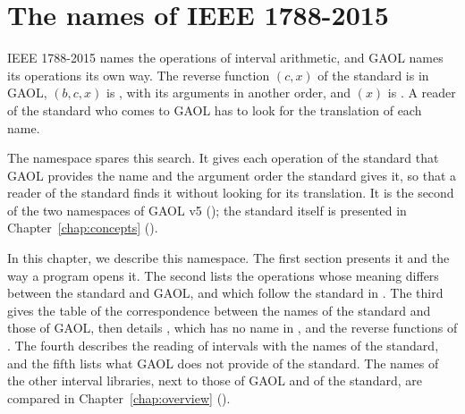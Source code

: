 \chapter{The names of IEEE 1788-2015}\label{chap:ieee1788}
%

IEEE 1788-2015 \cite{IEEE1788:2015} names the operations of interval
arithmetic, and GAOL names its operations its own way. The reverse function
$(c,x)$ of the standard is  in GAOL,
$(b,c,x)$ is , with its arguments in
another order, and $(x)$ is
. A reader of the standard who comes to GAOL
has to look for the translation of each name.

\medskip
The namespace  spares this search. It gives each
operation of the standard that GAOL provides the name and the argument order
the standard gives it, so that a reader of the standard finds it without
looking for its translation. It is the second of the two namespaces of GAOL
v5 (); the standard itself is presented in
Chapter~\ref{chap:concepts} ().

\medskip
In this chapter, we describe this namespace. The first section presents it
and the way a program opens it. The second lists the operations whose
meaning differs between the standard and GAOL, and which follow the standard
in . The third gives the table of the correspondence
between the names of the standard and those of GAOL, then details
, which has no name in , and the reverse
functions of . The fourth describes the reading of intervals
with the names of the standard, and the fifth lists what GAOL does not
provide of the standard. The names of the other interval libraries, next to
those of GAOL and of the standard, are compared in
Chapter~\ref{chap:overview} ().

